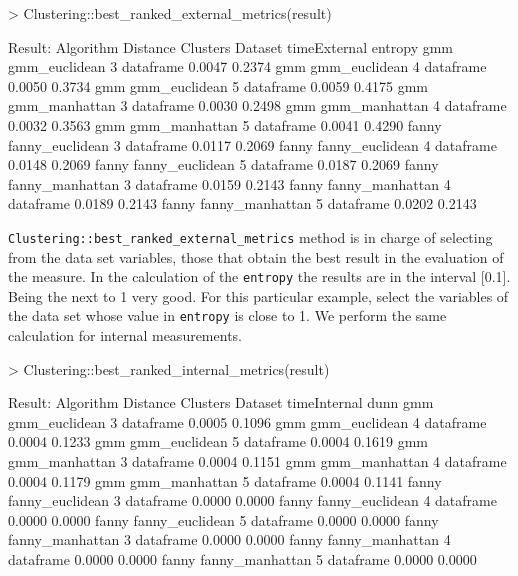 \begin{Schunk}
\begin{Sinput}
> Clustering::best_ranked_external_metrics(result)
\end{Sinput}
\begin{Soutput}
Result:
Algorithm  Distance         Clusters   Dataset  timeExternal entropy
  gmm        gmm_euclidean     3      dataframe    0.0047    0.2374
  gmm        gmm_euclidean     4      dataframe    0.0050    0.3734
  gmm        gmm_euclidean     5      dataframe    0.0059    0.4175
  gmm        gmm_manhattan     3      dataframe    0.0030    0.2498
  gmm        gmm_manhattan     4      dataframe    0.0032    0.3563
  gmm        gmm_manhattan     5      dataframe    0.0041    0.4290
fanny      fanny_euclidean     3      dataframe    0.0117    0.2069
fanny      fanny_euclidean     4      dataframe    0.0148    0.2069
fanny      fanny_euclidean     5      dataframe    0.0187    0.2069
fanny      fanny_manhattan     3      dataframe    0.0159    0.2143
fanny      fanny_manhattan     4      dataframe    0.0189    0.2143
fanny      fanny_manhattan     5      dataframe    0.0202    0.2143

\end{Soutput}
\end{Schunk}

\texttt{Clustering::best\_ranked\_external\_metrics} method is in charge of selecting from the data set variables, those that obtain the best result in the evaluation of the measure. In the calculation of the \texttt{entropy} the results are in the interval [0.1]. Being the next to 1 very good. For this particular example, select the variables of the data set whose value in \texttt{entropy} is close to 1. We perform the same calculation for internal measurements.

\begin{Schunk}
\begin{Sinput}
> Clustering::best_ranked_internal_metrics(result)
\end{Sinput}
\begin{Soutput}
Result:
Algorithm      Distance     Clusters   Dataset  timeInternal   dunn
   gmm       gmm_euclidean     3      dataframe   0.0005      0.1096
   gmm       gmm_euclidean     4      dataframe   0.0004      0.1233
   gmm       gmm_euclidean     5      dataframe   0.0004      0.1619
   gmm       gmm_manhattan     3      dataframe   0.0004      0.1151
   gmm       gmm_manhattan     4      dataframe   0.0004      0.1179
   gmm       gmm_manhattan     5      dataframe   0.0004      0.1141
 fanny     fanny_euclidean     3      dataframe   0.0000      0.0000
 fanny     fanny_euclidean     4      dataframe   0.0000      0.0000
 fanny     fanny_euclidean     5      dataframe   0.0000      0.0000
 fanny     fanny_manhattan     3      dataframe   0.0000      0.0000
 fanny     fanny_manhattan     4      dataframe   0.0000      0.0000
 fanny     fanny_manhattan     5      dataframe   0.0000      0.0000
\end{Soutput}
\end{Schunk}

